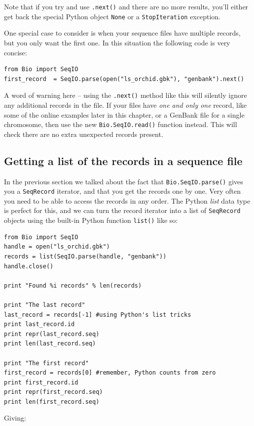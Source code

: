 \documentclass{report}
\begin{document}
Note that if you try and use \verb|.next()| and there are no more results, you'll either get back the special Python object \verb|None| or a \verb|StopIteration| exception.

One special case to consider is when your sequence files have multiple records, but you only want the first one.  In this situation the following code is very concise:

\begin{verbatim}
from Bio import SeqIO
first_record  = SeqIO.parse(open("ls_orchid.gbk"), "genbank").next()
\end{verbatim}

A word of warning here -- using the \verb|.next()| method like this will silently ignore any additional records in the file.
If your files have {\it one and only one} record, like some of the online examples later in this chapter, or a GenBank file for a single chromosome, then use the new \verb|Bio.SeqIO.read()| function instead.
This will check there are no extra unexpected records present.

\subsection{Getting a list of the records in a sequence file}

In the previous section we talked about the fact that \verb|Bio.SeqIO.parse()| gives you a \verb|SeqRecord| iterator, and that you get the records one by one.  Very often you need to be able to access the records in any order. The Python {\it list} data type is perfect for this, and we can turn the record iterator into a list of \verb|SeqRecord| objects using the built-in Python function \verb|list()| like so:

\begin{verbatim}
from Bio import SeqIO
handle = open("ls_orchid.gbk")
records = list(SeqIO.parse(handle, "genbank"))
handle.close()

print "Found %i records" % len(records)

print "The last record"
last_record = records[-1] #using Python's list tricks
print last_record.id
print repr(last_record.seq)
print len(last_record.seq)

print "The first record"
first_record = records[0] #remember, Python counts from zero
print first_record.id
print repr(first_record.seq)
print len(first_record.seq)
\end{verbatim}

\noindent Giving:
\end{document}
